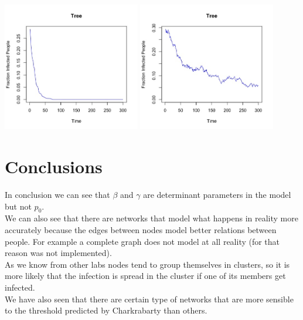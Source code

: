 \documentclass{article}
\begin{document}
\begin{center}
   
    
    \includegraphics[width=6cm]{tree_small.jpeg}
    \includegraphics[width=6cm]{tree_big.jpeg}
    
    
\end{center}



\newpage





 

\section{Conclusions}

\noindent In conclusion we can see that $\beta$ and $\gamma$ are determinant parameters in the model but not $p_{0}$.\\

\noindent We can also see that there are networks that model what happens in reality more accurately because the edges between nodes model better relations between people. For example a complete graph does not model at all reality (for that reason was not implemented).\\

\noindent As we know from other labs nodes tend to group themselves in clusters, so it is more likely that the infection is spread in the cluster if one of its members get infected.\\

\noindent We have also seen that there are certain type of networks that are more sensible to the threshold predicted by Charkrabarty than others.\\
\end{document}
